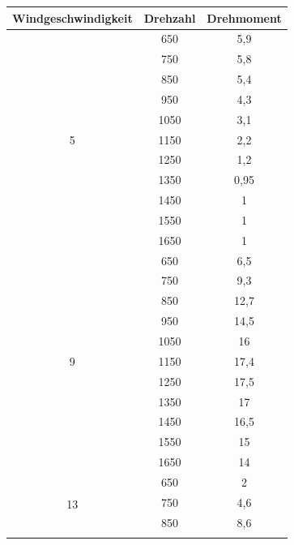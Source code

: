 \documentclass{report}
\begin{document}
\begin{table}[]
\begin{tabular}{|c|c|c|}
Windgeschwindigkeit & Drehzahl & Drehmoment \\ \hline
\multirow{11}{*}{5} & 650      & 5,9        \\ \cline{2-4}
                    & 750      & 5,8        \\ \cline{2-4}
                    & 850      & 5,4        \\ \cline{2-4}
                    & 950      & 4,3        \\ \cline{2-4}
                    & 1050     & 3,1        \\  \cline{2-4}
                    & 1150     & 2,2        \\ \cline{2-4}
                    & 1250     & 1,2        \\ \cline{2-4}
                    & 1350     & 0,95       \\ \cline{2-4}
                    & 1450     & 1          \\ \cline{2-4}
                    & 1550     & 1          \\ \cline{2-4}
                    & 1650     & 1 \\ \hline
\multirow{11}{*}{9} & 650      & 6,5        \\ \cline{2-4}
                    & 750      & 9,3        \\ \cline{2-4}
                    & 850      & 12,7       \\ \cline{2-4}
                    & 950      & 14,5       \\ \cline{2-4}
                    & 1050     & 16         \\ \cline{2-4}
                    & 1150     & 17,4       \\ \cline{2-4}
                    & 1250     & 17,5       \\ \cline{2-4}
                    & 1350     & 17         \\ \cline{2-4}
                    & 1450     & 16,5       \\ \cline{2-4}
                    & 1550     & 15         \\ \cline{2-4}
                    & 1650     & 14 \\ \hline
\multirow{11}{*}{13} & 650      & 2          \\ \cline{2-4}
                     & 750      & 4,6        \\ \cline{2-4}
                     & 850      & 8,6        \\ \cline{2-4}

\end{tabular}
\end{table}
\end{document}
